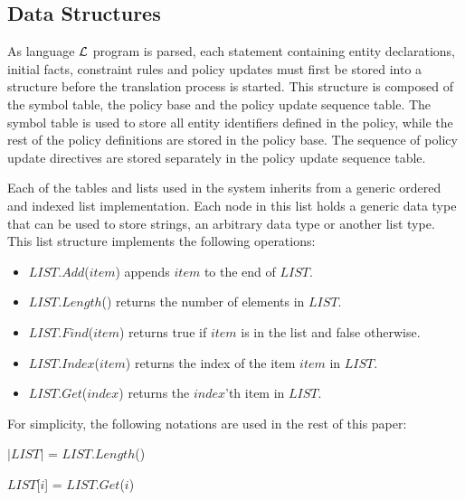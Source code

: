 \documentclass[11pt]{report}
\newenvironment{vquote}
{
  \begin{list}{}{\leftmargin 1em}\item[]
}
{
  \end{list}
}
\begin{document}
      \subsection{Data Structures}
        \label{subs-polup-dstru}

        As language ${\cal L}$ program is parsed, each statement containing
        entity declarations, initial facts, constraint rules and policy
        updates must first be stored into a structure before the translation
        process is started. This structure is composed of the symbol table,
        the policy base and the policy update sequence table. The symbol table
        is used to store all entity identifiers defined in the policy, while
        the rest of the policy definitions are stored in the policy base. The
        sequence of policy update directives are stored separately in the
        policy update sequence table.

        Each of the tables and lists used in the system inherits from a generic
        ordered and indexed list implementation. Each node in this list holds a
        generic data type that can be used to store strings, an arbitrary data
        type or another list type. This list structure implements the following
        operations:

        \begin{itemize}
          \item
            $LIST$.$Add$($item$) appends $item$ to the end of $LIST$.
          \item
            $LIST$.$Length$() returns the number of elements in $LIST$.

          \item
            $LIST$.$Find$($item$) returns true if $item$ is in the list and
            false otherwise.

          \item
            $LIST$.$Index$($item$) returns the index of the item $item$
            in $LIST$.

          \item
            $LIST$.$Get$($index$) returns the $index$'th item in $LIST$.
        \end{itemize}

        \noindent
        For simplicity, the following notations are used in the rest of this
        paper:

        \begin{vquote}
          $|LIST|$ = $LIST$.$Length$()

          $LIST$[$i$] = $LIST$.$Get$($i$)
        \end{vquote}
\end{document}
